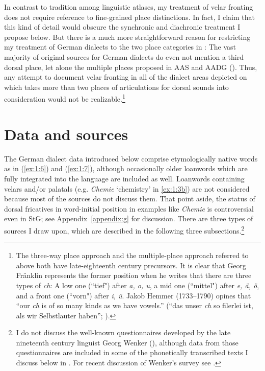 In contrast to tradition among linguistic atlases, my treatment of velar fronting does not require reference to fine-grained place distinctions. In fact, I claim that this kind of detail would obscure the synchronic and diachronic treatment I propose below. But there is a much more straightforward reason for restricting my treatment of German dialects to the two place categories in : The vast majority of original sources for German dialects do even not mention a third dorsal place, let alone the multiple places proposed in AAS and AADG (). Thus, any attempt to document velar fronting in all of the dialect areas depicted on  which takes more than two places of articulations for dorsal sounds into consideration would not be realizable.\footnote{The three-way place approach and the multiple-place approach referred to above both have late-eighteenth century precursors. It is clear that Georg Fränklin represents the former position when he writes \citep[26]{Fränklin1778} that there are three types of \textit{ch}: A low one (“tief") after \textit{a, o, u}, a mid one (“mittel") after \textit{e, ä, ö}, and a front one (“vorn") after \textit{i, ü}. Jakob Hemmer (1733--1790) opines that “our \textit{ch} is of so many kinds as we have vowels.” (“das unser \textit{ch} so filerlei ist, als wir Selbstlauter haben”; \citealt[68]{Hemmer1776} ).}

\section{{Data} {and} {sources}}\label{sec:1.6}\largerpage

The German dialect data introduced below comprise etymologically native words as in (\ref{ex:1:6}) and (\ref{ex:1:7}), although occasionally older loanwords which are fully integrated into the language are included as well. Loanwords containing velars and\slash or palatals (e.g. \textit{Chemie} ‘chemistry’ in \ref{ex:1:3b}) are not considered because most of the sources do not discuss them. That point aside, the status of dorsal fricatives in word-initial position in examples like \textit{Chemie} is controversial even in StG; see Appendix~\ref{appendix:g} for discussion. There are three types of sources I draw upon, which are described in the following three subsections.\footnote{I do not discuss the well-known questionnaires developed by the late nineteenth century linguist Georg Wenker (), although data from those questionnaires are included in some of the phonetically transcribed texts I discuss below in . For recent discussion of Wenker's survey see \citet{Fleischer2017}.} 

